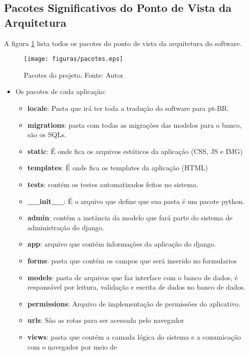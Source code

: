 \subsection{Pacotes Significativos do Ponto de Vista da Arquitetura}

A figura \ref{fig:pacotes} lista todos os pacotes do ponto de vista da arquitetura do software.

\begin{figure}[h!]
	\centering
  \texttt{[image: figuras/pacotes.eps]}
  \caption[Pacotes do projeto.]{Pacotes do projeto. Fonte: Autor}
	\label{fig:pacotes}
\end{figure}

\begin{itemize}
  \item Os pacotes de cada aplicação:
  \begin{itemize}
    \item \textbf{locale}: Pasta que irá ter toda a tradução do software para pt-BR.
    \item \textbf{migrations}: pasta com todas as migrações das modelos para o banco, são os SQLs.
    \item \textbf{static}: É onde fica os arquivos estáticos da aplicação (CSS, JS e IMG)
    \item \textbf{templates}: É onde fica os templates da aplicação (HTML)
    \item \textbf{tests}: contém os testes automatizados feitos no sistema.
    \item \textbf{\_\_init\_\_}: É o arquivo que define que sua pasta é um pacote python.
    \item \textbf{admin}: contém a instância da modelo que fará parte do sistema de administração do django.
    \item \textbf{app}: arquivo que contém informações da aplicação do django.
    \item \textbf{forms}: pasta que contém os campos que será inserido no formularios
    \item \textbf{models}: pasta de arquivos que faz interface com o banco de dados, é responsável por leitura,
      validação e escrita de dados no banco de dados.
    \item \textbf{permissions}: Arquivo de implementação de permissões do aplicativo.
    \item \textbf{urls}: São as rotas para ser acessada pelo navegador
    \item \textbf{views}: pasta que contém a camada lógica do sistema e a comunicação com o navegador por meio de

\end{itemize}
\end{itemize}
